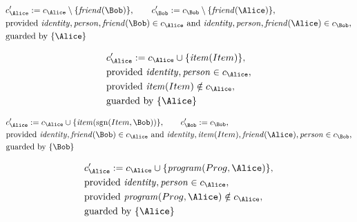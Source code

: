 \begin{align*}
&
c'_
{
\Alice
}
 := 
c_
{
\Alice
}
 \setminus 
\{
\mathit{\detokenize{
friend
}}
(
\Bob
)
\}
, \qquad 
c'_
{
\Bob
}
 := 
c_
{
\Bob
}
 \setminus 
\{
\mathit{\detokenize{
friend
}}
(
\Alice
)
\}
,\\
&
\text{provided } 
\mathit{\detokenize{
identity
}}
,
\mathit{\detokenize{
person
}}
,
\mathit{\detokenize{
friend
}}
(
\Bob
)
 \in c_
{
\Alice
}
 \text{ and } 
\mathit{\detokenize{
identity
}}
,
\mathit{\detokenize{
person
}}
,
\mathit{\detokenize{
friend
}}
(
\Alice
)
 \in c_
{
\Bob
}
,\\
&
\text{guarded by } \{
\Alice
\}
\end{align*}

\begin{align*}
&
c'_
{
\Alice
}
 := 
c_
{
\Alice
}
 \cup 
\{
\mathit{\detokenize{
item
}}
(
Item
)
\}
,\\
&
\text{provided } 
\mathit{\detokenize{
identity
}}
,
\mathit{\detokenize{
person
}}
 \in c_
{
\Alice
}
,\\
&
\text{provided } 
\mathit{\detokenize{
item
}}
(
Item
)
 \notin c_
{
\Alice
}
,\\
&
\text{guarded by } \{
\Alice
\}
\end{align*}

\begin{align*}
&
c'_
{
\Alice
}
 := 
c_
{
\Alice
}
 \cup 
\{
\mathit{\detokenize{
item
}}
(
\mathrm{sgn}(
Item
,
\Bob
)
)
\}
, \qquad 
c'_
{
\Bob
}
 := 
c_
{
\Bob
}
,\\
&
\text{provided } 
\mathit{\detokenize{
identity
}}
,
\mathit{\detokenize{
friend
}}
(
\Bob
)
 \in c_
{
\Alice
}
 \text{ and } 
\mathit{\detokenize{
identity
}}
,
\mathit{\detokenize{
item
}}
(
Item
)
,
\mathit{\detokenize{
friend
}}
(
\Alice
)
,
\mathit{\detokenize{
person
}}
 \in c_
{
\Bob
}
,\\
&
\text{guarded by } \{
\Bob
\}
\end{align*}

\begin{align*}
&
c'_
{
\Alice
}
 := 
c_
{
\Alice
}
 \cup 
\{
\mathit{\detokenize{
program
}}
(
Prog
,
\Alice
)
\}
,\\
&
\text{provided } 
\mathit{\detokenize{
identity
}}
,
\mathit{\detokenize{
person
}}
 \in c_
{
\Alice
}
,\\
&
\text{provided } 
\mathit{\detokenize{
program
}}
(
Prog
,
\Alice
)
 \notin c_
{
\Alice
}
,\\
&
\text{guarded by } \{
\Alice
\}
\end{align*}
\iffalse

